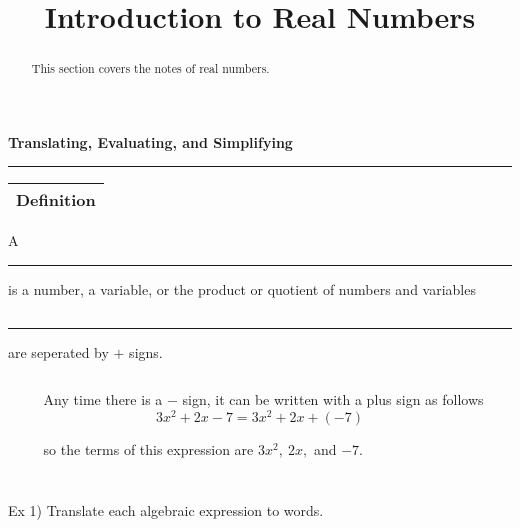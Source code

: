 \documentclass{ximera}
\title{Introduction to Real Numbers}
\begin{document}
\begin{abstract}
This section covers the notes of real numbers. 
\end{abstract}


{\LARGE \hspace{1in} \textbf{ Translating, Evaluating, and Simplifying}}

\noindent \rule{7.35in}{2pt}

\vspace{.2in}

\noindent \begin{tabular}{|c|}
\hline 
Definition\\
\hline 
\end{tabular} A \rule{1in}{.5pt} is a number, a variable, or the product or quotient of numbers and variables

$~$

\rule{1in}{.5pt} are seperated by $\displaystyle +$ signs.

$~$

$~~~~~~~~~~$ Any time there is a $\displaystyle -$ sign, it can be written with a plus sign as follows $$3x^2+2x-7=3x^2+2x+(-7)$$ 

$~~~~~~~~~~$ so the terms of this expression are $3x^2, ~ 2x,$ and $-7$.

$~$

$~$



\noindent Ex 1)  Translate each algebraic expression to words.

$~$
\end{document}

